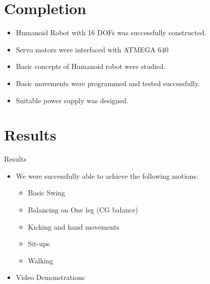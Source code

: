 \documentclass{beamer}
\begin{document}
\section{Completion}
\begin{frame}
	\begin{itemize}
		\item[\checkmark]  Humanoid Robot with 16 DOFs was successfully constructed.
		\item[\checkmark] Servo motors were interfaced with ATMEGA 640
		\item[\checkmark] Basic concepts of Humanoid robot were studied.
		\item[\checkmark] Basic movements were programmed and tested successfully.
		\item[\checkmark] Suitable power supply was designed.\\
		
		
	\end{itemize}
\end{frame}

\section{Results}
\begin{frame}{Results}
	\begin{itemize}
		\item We were successfully able to achieve the following motions:
		\begin{itemize}
			\item[\checkmark] Basic Swing
			\item[\checkmark] Balancing on One leg (CG balance)
			\item[\checkmark] Kicking and hand movements
			\item[\checkmark] Sit-ups
			\item[\checkmark] Walking\\
		\end{itemize}
		\item Video Demonstrations
	\end{itemize}
\end{frame}
\end{document}
